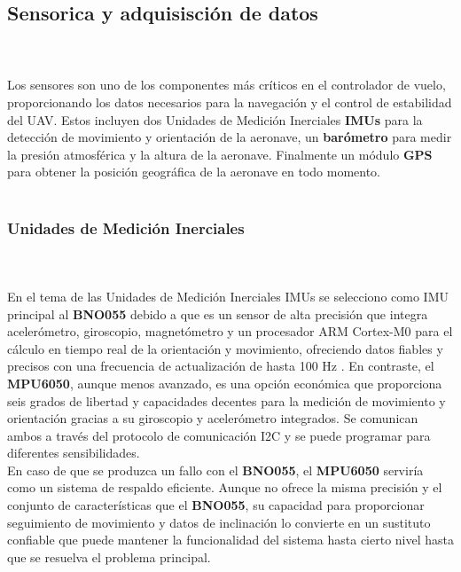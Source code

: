 \subsection{Sensorica y adquisisción de datos} \\ \\

Los sensores son uno de los componentes más críticos en el controlador de vuelo, proporcionando los datos necesarios para la navegación y el control de estabilidad del UAV. Estos incluyen dos Unidades de Medición Inerciales \textbf{IMUs} para la detección de movimiento y orientación de la aeronave, un \textbf{barómetro} para medir la presión atmosférica y la altura de la aeronave. Finalmente un módulo \textbf{GPS} para obtener la posición geográfica de la aeronave en todo momento. \\ \\


\subsubsection{ Unidades de Medición Inerciales} \\ \\


    En el tema de las Unidades de Medición Inerciales IMUs se selecciono como IMU principal al \textbf{BNO055} debido a que es un sensor de alta precisión que integra acelerómetro, giroscopio, magnetómetro y un procesador ARM Cortex-M0 para el cálculo en tiempo real de la orientación y movimiento, ofreciendo datos fiables y precisos con una frecuencia de actualización de hasta 100 Hz \cite{IMU}. En contraste, el \textbf{MPU6050}, aunque menos avanzado, es una opción económica que proporciona seis grados de libertad y capacidades decentes para la medición de movimiento y orientación gracias a su giroscopio y acelerómetro integrados. Se comunican ambos a través del protocolo de comunicación I2C y se puede programar para diferentes sensibilidades.\cite{BNO} \\ 
    
    
    
    En caso de que se produzca un fallo con el \textbf{BNO055}, el \textbf{MPU6050} serviría como un sistema de respaldo eficiente. Aunque no ofrece la misma precisión y el conjunto de características que el \textbf{BNO055}, su capacidad para proporcionar seguimiento de movimiento y datos de inclinación lo convierte en un sustituto confiable que puede mantener la funcionalidad del sistema hasta cierto nivel hasta que se resuelva el problema principal. \\ 

